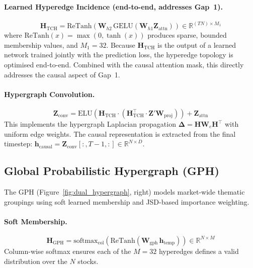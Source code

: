 \documentclass[a4paper,11pt]{report}
\begin{document}
\paragraph{Learned Hyperedge Incidence (end-to-end, addresses Gap~1).}
\begin{equation}
\mathbf{H}_{\text{TCH}} = \text{ReTanh}\!\left(\mathbf{W}_{h2}\,\text{GELU}(\mathbf{W}_{h1}\mathbf{Z}_{\text{attn}})\right) \in \mathbb{R}^{(TN)\times M_1}
\end{equation}
where $\text{ReTanh}(x)=\max(0,\tanh(x))$ produces sparse, bounded membership values, and $M_1 = 32$. Because $\mathbf{H}_{\text{TCH}}$ is the output of a learned network trained jointly with the prediction loss, the hyperedge topology is optimised end-to-end. Combined with the causal attention mask, this directly addresses the causal aspect of Gap~1.

\paragraph{Hypergraph Convolution.}
\begin{equation}
\mathbf{Z}_{\text{conv}} = \text{ELU}\!\left(\mathbf{H}_{\text{TCH}}\cdot\left(\mathbf{H}_{\text{TCH}}^{\top}\cdot\mathbf{Z}'\mathbf{W}_{\text{proj}}\right)\right) + \mathbf{Z}_{\text{attn}}
\end{equation}
This implements the hypergraph Laplacian propagation $\boldsymbol{\Delta}=\mathbf{H}\mathbf{W}_e\mathbf{H}^{\top}$ with uniform edge weights. The causal representation is extracted from the final timestep: $\mathbf{h}_{\text{causal}} = \mathbf{Z}_{\text{conv}}[:,T{-}1,:] \in \mathbb{R}^{N \times D}$.

\subsection{Global Probabilistic Hypergraph (GPH)}

The GPH (Figure~\ref{fig:dual_hypergraph}, right) models market-wide thematic groupings using soft learned membership and JSD-based importance weighting.

\paragraph{Soft Membership.}
\begin{equation}
\mathbf{H}_{\text{GPH}} = \text{softmax}_{\text{col}}\!\left(\text{ReTanh}(\mathbf{W}_{\text{gph}}\,\mathbf{h}_{\text{temp}})\right) \in \mathbb{R}^{N \times M}
\end{equation}
Column-wise softmax ensures each of the $M=32$ hyperedges defines a valid distribution over the $N$ stocks.
\end{document}
